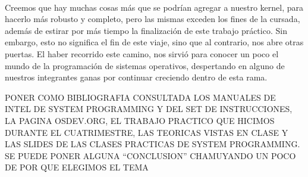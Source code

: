 \documentclass[11pt, a4paper]{article}
\begin{document}
	\paragraph{}
	Creemos que hay muchas cosas más que se podrían agregar a nuestro kernel, para hacerlo más robusto y completo, pero las mismas exceden los fines de la cursada, además de estirar por más tiempo la finalización de este trabajo práctico. Sin embargo, esto no significa el fin de este viaje, sino que al contrario, nos abre otras puertas. El haber recorrido este camino, nos sirvió para conocer un poco el mundo de la programación de sistemas operativos, despertando en alguno de nuestros integrantes ganas por continuar creciendo dentro de esta rama.





\Huge{PONER COMO BIBLIOGRAFIA CONSULTADA LOS MANUALES DE INTEL DE SYSTEM PROGRAMMING Y DEL SET DE INSTRUCCIONES, LA PAGINA OSDEV.ORG, EL TRABAJO PRACTICO QUE HICIMOS DURANTE EL CUATRIMESTRE, LAS TEORICAS VISTAS EN CLASE Y LAS SLIDES DE LAS CLASES PRACTICAS DE SYSTEM PROGRAMMING. SE PUEDE PONER ALGUNA ``CONCLUSION'' CHAMUYANDO UN POCO DE POR QUE ELEGIMOS EL TEMA}
\end{document}
